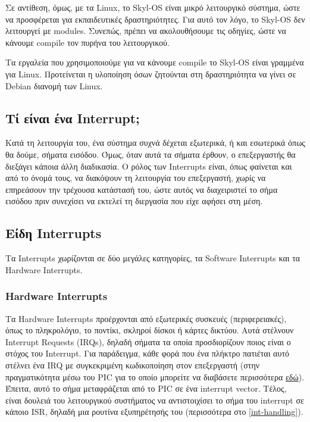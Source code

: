 \documentclass[18pt]{extarticle}
\begin{document}
Σε αντίθεση, όμως, με τα Linux, το Skyl-OS είναι μικρό λειτουργικό σύστημα, ώστε να προσφέρεται για εκπαιδευτικές δραστηριότητες.
Για αυτό τον λόγο, το Skyl-OS δεν λειτουργεί με modules. Συνεπώς, πρέπει να ακολουθήσουμε τις οδηγίες, ώστε να κάνουμε compile 
τον πυρήνα του λειτουργικού. 

\begin{warn}[Προσοχή]
    Τα εργαλεία που χρησιμοποιούμε για να κάνουμε compile το Skyl-OS είναι γραμμένα για Linux. Προτείνεται η υλοποίηση όσων
    ζητούνται στη δραστηριότητα να γίνει σε Debian διανομή των Linux.
\end{warn}

\subsection{Τί είναι ένα Interrupt;}

Κατά τη λειτουργία του, ένα σύστημα συχνά δέχεται εξωτερικά, ή και εσωτερικά όπως θα δούμε, σήματα εισόδου. Όμως, όταν αυτά τα σήματα
έρθουν, ο επεξεργαστής θα διεξάγει κάποια άλλη διαδικασία. Ο ρόλος των Interrupts είναι, όπως φαίνεται και από το όνομά τους, να διακόψουν
τη λειτουργία του επεξεργαστή, χωρίς να επηρεάσουν την τρέχουσα κατάστασή του, ώστε αυτός να διαχειριστεί το σήμα εισόδου πριν συνεχίσει να
εκτελεί τη διεργασία που είχε αφήσει στη μέση.

\subsection{Είδη Interrupts}

Τα Interrupts χωρίζονται σε δύο μεγάλες κατηγορίες, τα Software Interrupts και τα Hardware Interrupts.

\subsubsection{Hardware Interrupts}

Τα Hardware Interrupts προέρχονται από εξωτερικές συσκευές (περιφερειακές), όπως το πληκρολόγιο, το ποντίκι, σκληροί δίσκοι ή κάρτες δικτύου.
Αυτά στέλνουν Interrupt Requests (IRQs), δηλαδή σήματα τα οποία προσδιορίζουν ποιος είναι ο στόχος του Interrupt. Για παράδειγμα, κάθε φορά
που ένα πλήκτρο πατιέται αυτό στέλνει ένα IRQ με συγκεκριμένη κωδικοποίηση στον επεξεργαστή (στην πραγματικότητα μέσω του PIC για το οποίο
μπορείτε να διαβάσετε περισσότερα \href{https://wiki.osdev.org/8259_PIC}{εδώ}). Έπειτα, αυτό το σήμα μεταφράζεται από το PIC σε ένα interrupt vector. Τέλος, είναι δουλειά του 
λειτουργικού συστήματος να αντιστοιχίσει το σήμα του interrupt σε κάποιο ISR, δηλαδή μια ρουτίνα εξυπηρέτησής του (περισσότερα στο \ref{int-handling}).
\end{document}
